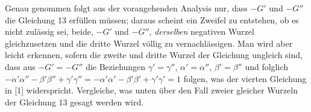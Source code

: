 \expandafter\def\csname HistoricalNoteText26\endcsname{Genau genommen folgt aus der vorangehenden Analysis nur, dass $-G'$ und $-G''$ die Gleichung 13 erfüllen müssen; daraus scheint ein Zweifel zu entstehen, ob es nicht zulässig sei, beide, $-G'$ und $-G''$, \textit{derselben} negativen Wurzel gleichzusetzen und die dritte Wurzel völlig zu vernachlässigen. Man wird aber leicht erkennen, sofern die zweite und dritte Wurzel der Gleichung ungleich sind, dass aus $-G'=\allowbreak -G''$ die Beziehungen $\gamma'=\gamma''$, $\alpha'=\alpha''$, $\beta'=\beta''$ und folglich
$-\alpha'\alpha''-\beta'\beta''+\allowbreak \gamma'\gamma''=\allowbreak -\alpha'\alpha'-\beta'\beta'+\allowbreak \gamma'\gamma'=1$ folgen, was der vierten Gleichung in [1] widerspricht. Vergleiche, was unten über den Fall zweier gleicher Wurzeln der Gleichung 13 gesagt werden wird.}
